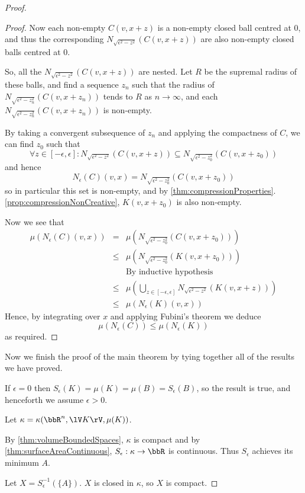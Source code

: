 \documentclass[a4paper,11pt]{article}
\begin{document}
\begin{proof}
\begin{proof}
Now each non-empty $C(v,x+z)$ is a non-empty closed
ball centred at $0$, and thus the corresponding
$N_{\sqrt{\epsilon^2-z^2}}(C(v,x+z))$ are also
non-empty closed balls centred at $0$.

So, all the $N_{\sqrt{\epsilon^2-z^2}}(C(v,x+z))$ are nested.  Let $R$ be the
supremal radius of these balls, and find a sequence
$z_n$ such that the radius of $N_{\sqrt{\epsilon^2-z_n^2}}(C(v,x+z_n))$ tends
to $R$ as $n\to\infty$, and each $N_{\sqrt{\epsilon^2-z_n^2}}(C(v,x+z_n))$ is
non-empty.

By taking a convergent subsequence of $z_n$ and applying the compactness of
$C$, we can find $z_0$ such that
\[
\forall z\in[-\epsilon,\epsilon]:N_{\sqrt{\epsilon^2-z^2}}(C(v,x+z))\subseteq
	N_{\sqrt{\epsilon^2-z_0^2}}(C(v,x+z_0))
\]
and hence
\[
N_\epsilon(C)(v,x)=N_{\sqrt{\epsilon^2-z_0^2}}(C(v,x+z_0))
\]
so in particular this set is non-empty, and by
\ref{thm:compressionProperties}.\ref{prop:compressionNonCreative}, $K(v,x+z_0)$
is also non-empty.

Now we see that
%
\begin{eqnarray*}
\mu(N_\epsilon(C)(v,x))
&=& \mu\left(N_{\sqrt{\epsilon^2-z_0^2}}(C(v,x+z_0))\right) \\
&\leq& \mu\left(N_{\sqrt{\epsilon^2-z_0^2}}(K(v,x+z_0))\right) \\
&& \textrm{By inductive hypothesis} \\
&\leq& \mu\left(\bigcup_{z\in[-\epsilon,\epsilon]}
	N_{\sqrt{\epsilon^2-z^2}}(K(v,x+z))\right) \\
&\leq& \mu(N_\epsilon(K)(v,x))
\end{eqnarray*}
%
Hence, by integrating over $x$ and applying Fubini's theorem we deduce
\[
\mu(N_\epsilon(C))\leq\mu(N_\epsilon(K))
\]
as required.
\end{proof}

Now we finish the proof of the main theorem by tying together all of the
results we have proved.

If $\epsilon=0$ then $S_\epsilon(K)=\mu(K)=\mu(B)=S_\epsilon(B)$, so the result
is true, and henceforth we assume $\epsilon>0$.

Let $\kappa=\kappa(\bbR^n,\lV K\rV,\mu(K))$.

By \ref{thm:volumeBoundedSpaces}, $\kappa$ is compact and by
\ref{thm:surfaceAreaContinuous}, $S_\epsilon:\kappa\to\bbR$ is continuous.
Thus $S_\epsilon$ achieves its minimum $A$.

Let $X=S_\epsilon^{-1}(\{A\})$.  $X$ is closed in $\kappa$, so $X$ is compact.


\end{proof}
\end{document}
